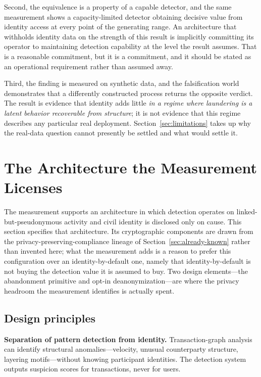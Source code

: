 \documentclass[11pt]{article}
\begin{document}
Second, the equivalence is a property of a capable detector, and the same measurement shows a
capacity-limited detector obtaining decisive value from identity access at every point of the
generating range. An architecture that withholds identity data on the strength of this result is
implicitly committing its operator to maintaining detection capability at the level the result
assumes. That is a reasonable commitment, but it is a commitment, and it should be stated as an
operational requirement rather than assumed away.

Third, the finding is measured on synthetic data, and the falsification world demonstrates that a
differently constructed process returns the opposite verdict. The result is evidence that identity
adds little \emph{in a regime where laundering is a latent behavior recoverable from structure}; it
is not evidence that this regime describes any particular real deployment. Section~\ref{sec:limitations}
takes up why the real-data question cannot presently be settled and what would settle it.
\section{The Architecture the Measurement Licenses}
\label{sec:architecture}

The measurement supports an architecture in which detection operates on linked-but-pseudonymous
activity and civil identity is disclosed only on cause. This section specifies that architecture. Its
cryptographic components are drawn from the privacy-preserving-compliance lineage of
Section~\ref{sec:already-known} rather than invented here; what the measurement adds is a reason to
prefer this configuration over an identity-by-default one, namely that identity-by-default is not
buying the detection value it is assumed to buy. Two design elements---the abandonment primitive and
opt-in deanonymization---are where the privacy headroom the measurement identifies is actually spent.

\subsection{Design principles}

\textbf{Separation of pattern detection from identity.} Transaction-graph analysis can identify
structural anomalies---velocity, unusual counterparty structure, layering motifs---without knowing
participant identities. The detection system outputs suspicion scores for transactions, never for
users.
\end{document}
